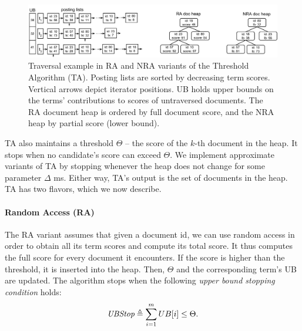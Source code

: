 

\begin{figure}[tbh]
\centering
\includegraphics[width=0.95\linewidth]{figures/postingsLists}
\caption{Traversal example in  RA and NRA variants of the Threshold Algorithm (TA). Posting lists are sorted by decreasing term scores. Vertical arrows depict iterator positions.  UB  holds upper bounds on the terms' contributions to scores of untraversed documents. The RA document heap is ordered by full document score, and the NRA heap  by partial score (lower bound).}
\label{fig:lists}
\end{figure}

TA also maintains a threshold $\Theta$ -- the score of the $k$-th document in the heap.
It stops when no candidate's score can exceed $\Theta$. 
We implement approximate variants of TA by stopping whenever the heap does not change for some parameter $\Delta$ ms. 
Either way, 
TA's output is the set of documents in the heap.
TA has two flavors, which we now describe.

\paragraph{Random Access (RA)} 
The RA variant assumes that given a document id, we can use random access in order to obtain all its term scores and compute its total score. It thus computes the full score for every document it encounters. If the score is higher than the threshold, it is inserted into the heap. Then, $\Theta$ and the corresponding term's UB are updated. The algorithm stops when 
the following \emph{upper bound stopping condition} holds:
\begin{equation} \label{eq:stop}
\textit{UBStop} \triangleq \sum_{i=1}^m UB[i] \le \Theta.
\end{equation}

